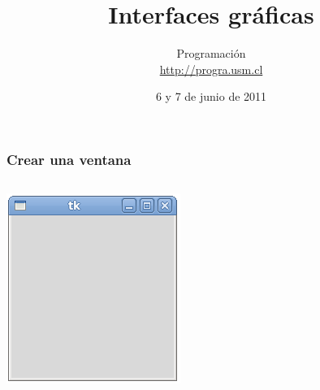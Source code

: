 \documentclass[12pt]{beamer}
\title{Interfaces gráficas}
\author{Programación \\ \url{http://progra.usm.cl}}
\date{6 y 7 de junio de 2011}
\begin{document}
  \begin{frame}
    \maketitle
  \end{frame}

  \begin{frame}
    \label{crear-ventana}
    \frametitle{Crear una ventana}
    \begin{columns}[B]
        \LARGE
        
        \vspace{10ex}
        \vspace{10ex}
        \includegraphics[width=\textwidth]{programas/tkinter/capturas/01.png}
    \end{columns}
  \end{frame}
\end{document}
